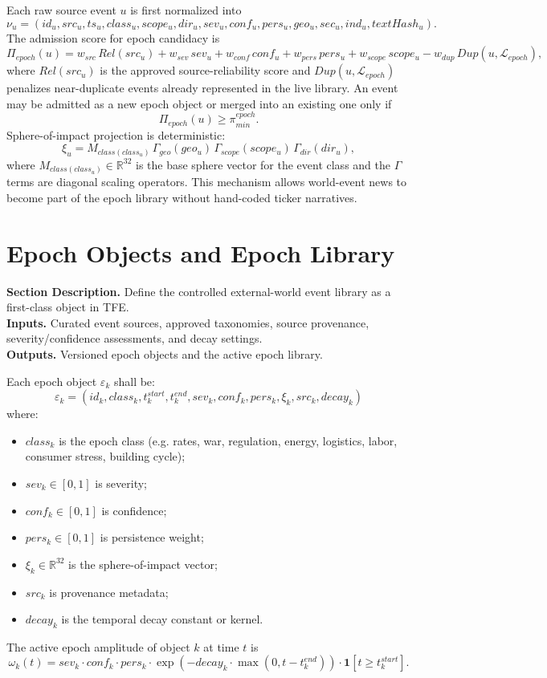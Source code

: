 \documentclass[11pt]{report}
\newcommand{\meta}[3]{\textbf{Section Description.} #1\\
\textbf{Inputs.} #2\\
\textbf{Outputs.} #3\par}
\begin{document}
Each raw source event $u$ is first normalized into
\[
\nu_u=(id_u,src_u,ts_u,class_u,scope_u,dir_u,sev_u,conf_u,pers_u,geo_u,sec_u,ind_u,textHash_u).
\]
The admission score for epoch candidacy is
\[
\Pi_{epoch}(u)=w_{src}\,Rel(src_u)+w_{sev}\,sev_u+w_{conf}\,conf_u+w_{pers}\,pers_u+w_{scope}\,scope_u-w_{dup}\,Dup(u,\mathcal{L}_{epoch}),
\]
where $Rel(src_u)$ is the approved source-reliability score and $Dup(u,\mathcal{L}_{epoch})$ penalizes near-duplicate events already represented in the live library. An event may be admitted as a new epoch object or merged into an existing one only if
\[
\Pi_{epoch}(u)\ge \pi_{min}^{epoch}.
\]
Sphere-of-impact projection is deterministic:
\[
\xi_u = M_{class(class_u)}\,\Gamma_{geo}(geo_u)\,\Gamma_{scope}(scope_u)\,\Gamma_{dir}(dir_u),
\]
where $M_{class(class_u)}\in\mathbb{R}^{32}$ is the base sphere vector for the event class and the $\Gamma$ terms are diagonal scaling operators. This mechanism allows world-event news to become part of the epoch library without hand-coded ticker narratives.

\section{Epoch Objects and Epoch Library}
\meta{Define the controlled external-world event library as a first-class object in TFE.}{Curated event sources, approved taxonomies, source provenance, severity/confidence assessments, and decay settings.}{Versioned epoch objects and the active epoch library.}

Each epoch object $\varepsilon_k$ shall be:
\[
\varepsilon_k = (id_k,class_k,t_k^{start},t_k^{end},sev_k,conf_k,pers_k,\xi_k,src_k,decay_k)
\]
where:
\begin{itemize}
\item $class_k$ is the epoch class (e.g. rates, war, regulation, energy, logistics, labor, consumer stress, building cycle);
\item $sev_k\in[0,1]$ is severity;
\item $conf_k\in[0,1]$ is confidence;
\item $pers_k\in[0,1]$ is persistence weight;
\item $\xi_k\in\mathbb{R}^{32}$ is the sphere-of-impact vector;
\item $src_k$ is provenance metadata;
\item $decay_k$ is the temporal decay constant or kernel.
\end{itemize}

The active epoch amplitude of object $k$ at time $t$ is
\[
\omega_k(t)=sev_k\cdot conf_k\cdot pers_k\cdot \exp(-decay_k\cdot \max(0,t-t_k^{end}))\cdot \mathbf{1}[t\ge t_k^{start}].
\]
\end{document}
